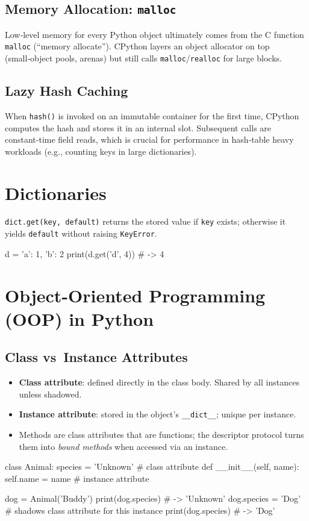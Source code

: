 \subsection*{Memory Allocation: \texttt{malloc}}
Low‑level memory for every Python object ultimately comes from the C function \verb|malloc| 
(“memory allocate”).  CPython layers an object allocator on top (small‑object pools, arenas) 
but still calls \verb|malloc|/\verb|realloc| for large blocks.

\subsection*{Lazy Hash Caching}
When \verb|hash()| is invoked on an immutable container for the first time, CPython computes the 
hash and stores it in an internal slot. Subsequent calls are constant‑time field reads, which is 
crucial for performance in hash‑table heavy workloads (e.g., counting keys in large dictionaries).

\section{Dictionaries}
\verb|dict.get(key, default)| returns the stored value if \verb|key| exists; otherwise it yields \verb|default| without raising \verb|KeyError|.
\begin{python}
d = {'a': 1, 'b': 2}
print(d.get('d', 4))  # -> 4
\end{python}

\section{Object-Oriented Programming (OOP) in Python}
\subsection{Class vs\ Instance Attributes}
\begin{itemize}
  \item \textbf{Class attribute}: defined directly in the class body.  Shared by all instances unless shadowed.
  \item \textbf{Instance attribute}: stored in the object’s \verb|__dict__|; unique per instance.
  \item Methods are class attributes that are functions; the descriptor protocol turns them into \emph{bound methods} when accessed via an instance.
\end{itemize}
\begin{python}
class Animal:
    species = 'Unknown'   # class attribute
    def __init__(self, name):
        self.name = name  # instance attribute

dog = Animal('Buddy')
print(dog.species)  # -> 'Unknown'
dog.species = 'Dog'       # shadows class attribute for this instance
print(dog.species)  # -> 'Dog'
\end{python}

